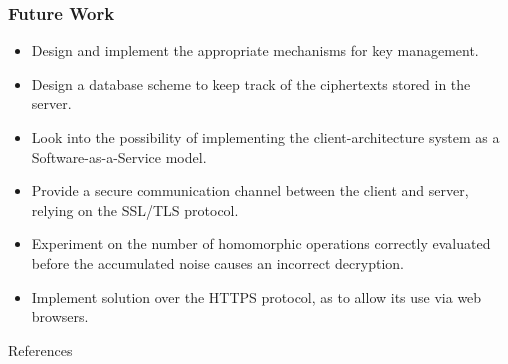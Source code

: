 \documentclass{beamer}
\begin{document}
\begin{frame}
\frametitle{Future Work}
\begin{itemize}
\item Design and implement the appropriate mechanisms for key management.
\item Design a database scheme to keep track of the ciphertexts stored in the server.
\item Look into the possibility of implementing the client-architecture system as a Software-as-a-Service model.
\item Provide a secure communication channel between the client and server, relying on the SSL/TLS protocol.
\item Experiment on the number of homomorphic operations correctly evaluated before the accumulated noise causes an incorrect decryption.
\item Implement solution over the HTTPS protocol, as to allow its use via web browsers.
\end{itemize}

\end{frame}


\begin{frame}[allowframebreaks]{References}
\def\newblock{}


\end{frame}

\end{document}
